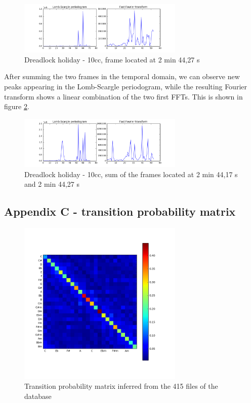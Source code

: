 \documentclass[letterpaper]{article}
\begin{document}
\begin{figure}[h!]
\begin{center}
\includegraphics[width=3.1in,angle=0]{imgs/2frame.png}
\caption{Dreadlock holiday - 10cc, frame located at 2 min 44,27 s}
\label{fig:frame2}
\end{center}
\end{figure}

After summing the two frames in the temporal domain, we can observe new peaks appearing in the Lomb-Scargle periodogram, while the resulting Fourier transform shows a linear combination of the two first FFTs. This is shown in figure \ref{fig:frame1and2}.

\begin{figure}[h!]
\begin{center}
\includegraphics[width=3.1in,angle=0]{imgs/2frames.png}
\caption{Dreadlock holiday - 10cc, sum of the frames located at 2 min 44,17 s and 2 min 44,27 s}
\label{fig:frame1and2}
\end{center}
\end{figure}

\subsection{Appendix C - transition probability matrix}

\begin{figure}[h!]
\begin{center}
\includegraphics[width=3.1in,angle=0]{imgs/probs.png}
\caption{Transition probability matrix inferred from the 415 files of the database}
\label{}
\end{center}
\end{figure}
\end{document}
